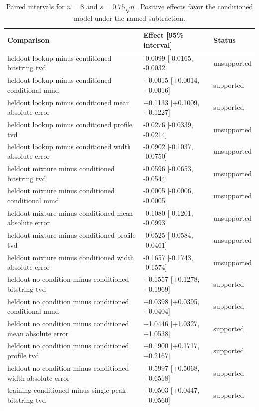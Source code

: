 \begin{table}[p]
\centering
\scriptsize
\setlength{\tabcolsep}{4pt}
\caption{Paired intervals for $n=8$ and $s=0.75\sqrt n$. Positive effects favor the conditioned model under the named subtraction.}
\label{tab:all-intervals-n8-w0.75}
\begin{tabular}{@{}p{}p{}p{}@{}}
\toprule
Comparison & Effect [95\% interval] & Status\\
\midrule
heldout lookup minus conditioned bitstring tvd & -0.0099 [-0.0165, -0.0032] & unsupported \\
heldout lookup minus conditioned conditional mmd & +0.0015 [+0.0014, +0.0016] & supported \\
heldout lookup minus conditioned mean absolute error & +0.1133 [+0.1009, +0.1227] & supported \\
heldout lookup minus conditioned profile tvd & -0.0276 [-0.0339, -0.0214] & unsupported \\
heldout lookup minus conditioned width absolute error & -0.0902 [-0.1037, -0.0750] & unsupported \\
heldout mixture minus conditioned bitstring tvd & -0.0596 [-0.0653, -0.0544] & unsupported \\
heldout mixture minus conditioned conditional mmd & -0.0005 [-0.0006, -0.0005] & unsupported \\
heldout mixture minus conditioned mean absolute error & -0.1080 [-0.1201, -0.0993] & unsupported \\
heldout mixture minus conditioned profile tvd & -0.0525 [-0.0584, -0.0461] & unsupported \\
heldout mixture minus conditioned width absolute error & -0.1657 [-0.1743, -0.1574] & unsupported \\
heldout no condition minus conditioned bitstring tvd & +0.1557 [+0.1278, +0.1969] & supported \\
heldout no condition minus conditioned conditional mmd & +0.0398 [+0.0395, +0.0404] & supported \\
heldout no condition minus conditioned mean absolute error & +1.0446 [+1.0327, +1.0538] & supported \\
heldout no condition minus conditioned profile tvd & +0.1900 [+0.1717, +0.2167] & supported \\
heldout no condition minus conditioned width absolute error & +0.5997 [+0.5068, +0.6518] & supported \\
training conditioned minus single peak bitstring tvd & +0.0503 [+0.0447, +0.0560] & supported \\

\end{tabular}
\end{table}
